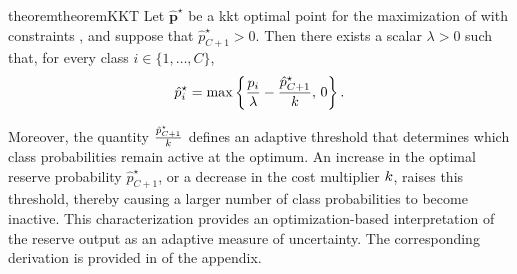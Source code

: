 \begin{restatable}{theorem}{theoremKKT}
    \label{theorem:kkt}
    Let $\hat{\mathbf p}^\star$ be a \gls*{kkt} optimal point for the maximization of  with constraints , and suppose that $\hat p^\star_{C+1}>0$. Then there exists a scalar $\lambda>0$ such that, for every class $i\in\{1,\ldots,C\}$,
    \begin{align}
        \label{eq:kkt_conditions_solution}
        \hat p_i^\star = \max\left\{\frac{p_i}{\lambda} - \frac{\hat p_{C+1}^\star}{k}, \,0 \right\}.
    \end{align}
\end{restatable}
Moreover, the quantity
\(
\label{eq:threshold}
\frac{\hat p_{C+1}^\star}{k}
\)
defines an adaptive threshold that determines which class probabilities
remain active at the optimum. An increase in the optimal reserve probability
$\hat p_{C+1}^\star$, or a decrease in the cost multiplier $k$, raises
this threshold, thereby causing a larger number of class probabilities to
become inactive. This characterization provides an optimization-based
interpretation of the reserve output as an adaptive measure of uncertainty.
The corresponding derivation is provided in  of the appendix.

